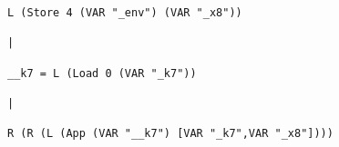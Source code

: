 \begin{landscape}
\begin{lstlisting}[basicstyle=\fontsize{5.5}{6.5}\selectfont\ttfamily]
                                                                                                       L (Store 4 (VAR "_env") (VAR "_x8"))
                                                                                                                        |
                                                                                                          __k7 = L (Load 0 (VAR "_k7"))
                                                                                                                        |
                                                                                                R (R (L (App (VAR "__k7") [VAR "_k7",VAR "_x8"])))

\end{lstlisting}
\end{landscape}
\clearpage

